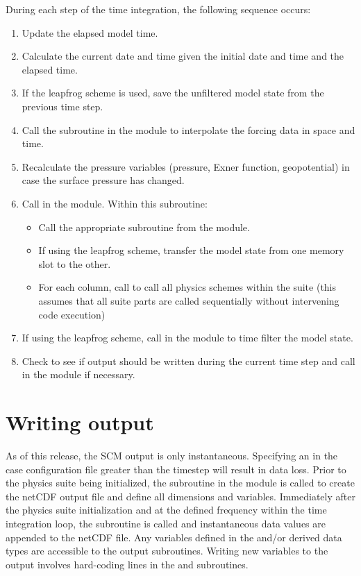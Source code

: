 During each step of the time integration, the following sequence occurs:
\begin{enumerate}
\item Update the elapsed model time.
\item Calculate the current date and time given the initial date and time and the elapsed time.
\item If the leapfrog scheme is used, save the unfiltered model state from the previous time step.
\item Call the  subroutine in the  module to interpolate the forcing data in space and time.
\item Recalculate the pressure variables (pressure, Exner function, geopotential) in case the surface pressure has changed.
\item Call  in the  module. Within this subroutine:
\begin{itemize}
\item Call the appropriate  subroutine from the  module.
\item If using the leapfrog scheme, transfer the model state from one memory slot to the other.
\item For each column, call  to call all physics schemes within the suite (this assumes that all suite parts are called sequentially without intervening code execution)
\end{itemize}
\item If using the leapfrog scheme, call  in the  module to time filter the model state.
\item Check to see if output should be written during the current time step and call  in the  module if necessary.
\end{enumerate}

\section{Writing output}
As of this release, the SCM output is only instantaneous. Specifying an  in the case configuration file greater than the timestep will result in data loss. Prior to the physics suite being initialized, the  subroutine in the  module is called to create the netCDF output file and define all dimensions and variables. Immediately after the physics suite initialization and at the defined frequency within the time integration loop, the  subroutine is called and instantaneous data values are appended to the netCDF file. Any variables defined in the  and/or  derived data types are accessible to the output subroutines. Writing new variables to the output involves hard-coding lines in the  and  subroutines. 
